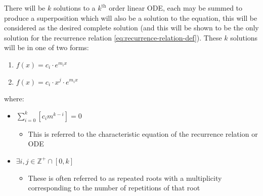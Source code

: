 \documentclass[11pt]{article}
\begin{document}
There will be \(k\) solutions to a \(k^{\mathrm{th}}\) order linear ODE, each may be summed to produce a superposition which will also be a solution to the equation, \cite[Ch. 4]{zillDifferentialEquations2009a}  this will be considered as the desired complete solution (and this will be shown to be the only solution for the recurrence relation \eqref{eq:recurrence-relation-def}). These \(k\) solutions will be in one of two forms:

\begin{enumerate}
\item \(f(x)=c_{i} \cdot e^{m_{i}x}\)
\item \(f(x)=c_{i} \cdot x^{j}\cdot e^{m_{i}x}\)
\end{enumerate}

where:

\begin{itemize}
\item \(\sum^{k}_{i=0}\left[  c_{i}m^{k-i} \right] = 0\)
\begin{itemize}
\item This is referred to the characteristic equation of the recurrence relation or ODE \cite{levinSolvingRecurrenceRelations2018}
\end{itemize}
\item \(\exists i,j \in \mathbb{Z}^{+} \cap \left[0,k\right]\)
\begin{itemize}
\item These is often referred to as repeated roots \cite{levinSolvingRecurrenceRelations2018,zillMatrixExponential2009} with a multiplicity corresponding to the number of repetitions of that root \cite[]{nicodemiIntroductionAbstractAlgebra2007}
\end{itemize}
\end{itemize}
\end{document}
